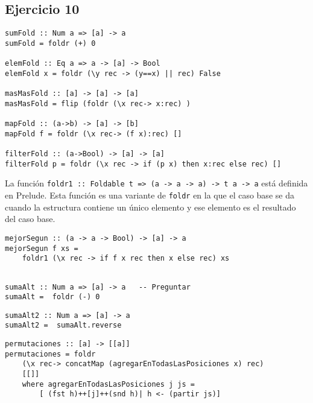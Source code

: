 \subsection{Ejercicio 10}
\begin{centrado}
	\begin{verbatim}
sumFold :: Num a => [a] -> a
sumFold = foldr (+) 0

elemFold :: Eq a => a -> [a] -> Bool
elemFold x = foldr (\y rec -> (y==x) || rec) False

masMasFold :: [a] -> [a] -> [a]
masMasFold = flip (foldr (\x rec-> x:rec) )

mapFold :: (a->b) -> [a] -> [b]
mapFold f = foldr (\x rec-> (f x):rec) []

filterFold :: (a->Bool) -> [a] -> [a]
filterFold p = foldr (\x rec -> if (p x) then x:rec else rec) []
	\end{verbatim}
\end{centrado}

La función \texttt{foldr1 :: Foldable t => (a -> a -> a) -> t a -> a} está definida en Prelude. Esta función es una variante de \texttt{foldr} en la que el caso base se da cuando la estructura contiene un único elemento y ese elemento es el resultado del caso base.

\begin{centrado}
	\begin{verbatim}
mejorSegun :: (a -> a -> Bool) -> [a] -> a
mejorSegun f xs = 
	foldr1 (\x rec -> if f x rec then x else rec) xs
	\end{verbatim}
\end{centrado}

\begin{centrado}
	\begin{verbatim}

sumaAlt :: Num a => [a] -> a   -- Preguntar
sumaAlt =  foldr (-) 0
	\end{verbatim}
\end{centrado}

\begin{centrado}
	\begin{verbatim}
sumaAlt2 :: Num a => [a] -> a
sumaAlt2 =  sumaAlt.reverse
	\end{verbatim}
\end{centrado}

\begin{centrado}
	\begin{verbatim}
permutaciones :: [a] -> [[a]]
permutaciones = foldr 
	(\x rec-> concatMap (agregarEnTodasLasPosiciones x) rec) 
	[[]] 
	where agregarEnTodasLasPosiciones j js = 
		[ (fst h)++[j]++(snd h)| h <- (partir js)]
	\end{verbatim}
\end{centrado}


